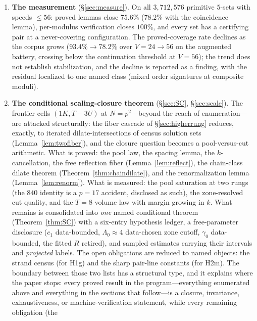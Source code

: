 \documentclass[11pt,a4paper]{article}
\numberwithin{equation}{section}
\theoremstyle{plain}
\theoremstyle{definition}
\theoremstyle{remark}
\begin{document}
\begin{enumerate}[leftmargin=1.6em,itemsep=2pt]
{  the covering obstruction is governed by a small translate-class
  structure}. The measured coverage rates of \S\ref{sec:measure} are a
  consequence of this structure, not the primary result.
\item \textbf{The measurement} (\S\ref{sec:measure}). On all
  $3{,}712{,}576$ primitive $5$-sets with speeds $\le 56$: proved lemmas
  close $75.6\%$ ($78.2\%$ with the coincidence lemma), per-modulus
  verification closes $100\%$, and every set has a certifying pair at a
  never-covering configuration. The proved-coverage rate declines as the
  corpus grows ($93.4\%\to78.2\%$ over $V=24\to56$ on the augmented
  battery, crossing below the continuation threshold at $V=56$); the trend
  does not establish stabilization, and the decline is reported as a
  finding, with the residual localized to one named class (mixed order
  signatures at composite moduli).
\item \textbf{The conditional scaling-closure theorem}
  (\S\ref{sec:SC}, \S\ref{sec:scale}). The frontier cells
  $(1K,T{-}3U)$ at $N=p^2$---beyond the reach of enumeration---are
  attacked structurally: the fiber cascade of \S\ref{sec:higherrung}
  reduces, exactly, to iterated dilate-intersections of census solution
  sets (Lemma~\ref{lem:twofiber}), and the closure question becomes a
  pool-versus-cut arithmetic. What is proved: the pool law, the spacing
  lemma, the $k$-cancellation, the free reflection fiber
  (Lemma~\ref{lem:reflect}), the chain-class dilate theorem
  (Theorem~\ref{thm:chaindilate}), and the renormalization lemma
  (Lemma~\ref{lem:renorm}). What is measured: the pool saturation at two
  rungs (the $840$ identity is a $p=17$ accident, disclosed as such),
  the zone-resolved cut quality, and the $T=8$ volume law with margin
  growing in $k$. What remains is consolidated into \emph{one} named
  conditional theorem (Theorem~\ref{thm:SC}) with a six-entry hypothesis
  ledger, a free-parameter disclosure ($c_1$ data-bounded, $\Lambda_0\approx4$
  data-chosen zone cutoff, $\gamma_0$ data-bounded, the fitted $R$ retired), and
  sampled estimates carrying their intervals and \emph{projected} labels.
  The open obligations are reduced to named objects: the strand
  census (for H1g) and the sharp pair-line constants (for H2m).
  The boundary between those two lists has a structural type, and it
  explains where the paper stops: every proved result in the
  program---everything enumerated above and everything in the sections
  that follow---is a closure, invariance, exhaustiveness, or
  machine-verification statement, while every remaining obligation (the

\end{enumerate}
\end{document}
